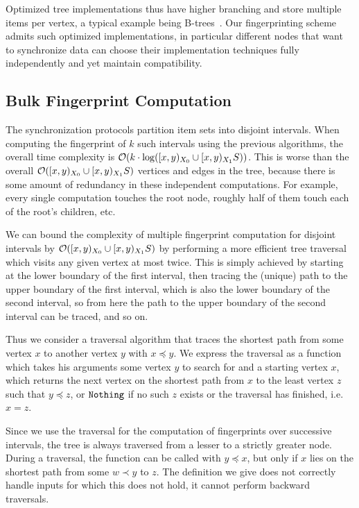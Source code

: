 Optimized tree implementations thus have higher branching and store multiple items per vertex, a typical example being B-trees~\cite{bayer2002organization}. Our fingerprinting scheme admits such optimized implementations, in particular different nodes that want to synchronize data can choose their implementation techniques fully independently and yet maintain compatibility.

\subsection{Bulk Fingerprint Computation}
\label{bulk}

The synchronization protocols partition item sets into disjoint intervals. When computing the fingerprint of $k$ such intervals using the previous algorithms, the overall time complexity is $\mathcal{O}(k \cdot \log([{x},{y})_{X_0} \cup [{x},{y})_{X_1}{S}))$. This is worse than the overall $\mathcal{O}([{x},{y})_{X_0} \cup [{x},{y})_{X_1}{S})$ vertices and edges in the tree, because there is some amount of redundancy in these independent computations. For example, every single computation touches the root node, roughly half of them touch each of the root's children, etc.

We can bound the complexity of multiple fingerprint computation for disjoint intervals by $\mathcal{O}([{x},{y})_{X_0} \cup [{x},{y})_{X_1}{S})$ by performing a more efficient tree traversal which visits any given vertex at most twice. This is simply achieved by starting at the lower boundary of the first interval, then tracing the (unique) path to the upper boundary of the first interval, which is also the lower boundary of the second interval, so from here the path to the upper boundary of the second interval can be traced, and so on.

Thus we consider a traversal algorithm that traces the shortest path from some vertex $x$ to another vertex $y$ with $x \preceq y$. We express the traversal as a function which takes his arguments some vertex $y$ to search for and a starting vertex $x$, which returns the next vertex on the shortest path from $x$ to the least vertex $z$ such that $y \preceq z$, or $\mathtt{Nothing}$ if no such $z$ exists or the traversal has finished, i.e. $x = z$.

Since we use the traversal for the computation of fingerprints over successive intervals, the tree is always traversed from a lesser to a strictly greater node. During a traversal, the function can be called with $y \preceq x$, but only if $x$ lies on the shortest path from some $w \prec y$ to $z$. The definition we give does not correctly handle inputs for which this does not hold, it cannot perform backward traversals.

